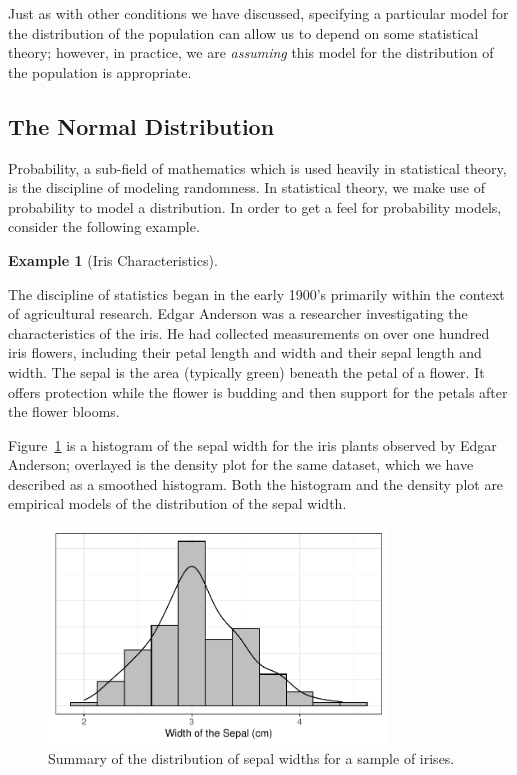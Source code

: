\documentclass[
  letterpaper,
  DIV=11,
  numbers=noendperiod]{scrreprt}
\theoremstyle{definition}
\theoremstyle{definition}
\newtheorem{example}{Example}[chapter]
\theoremstyle{plain}
\theoremstyle{remark}
\begin{document}
Just as with other conditions we have discussed, specifying a particular
model for the distribution of the population can allow us to depend on
some statistical theory; however, in practice, we are \emph{assuming}
this model for the distribution of the population is appropriate.

\hypertarget{the-normal-distribution}{%
\subsection{The Normal Distribution}\label{the-normal-distribution}}

Probability, a sub-field of mathematics which is used heavily in
statistical theory, is the discipline of modeling randomness. In
statistical theory, we make use of probability to model a distribution.
In order to get a feel for probability models, consider the following
example.

\begin{example}[Iris
Characteristics]\protect\hypertarget{exm-iris}{}\label{exm-iris}

The discipline of statistics began in the early 1900's primarily within
the context of agricultural research. Edgar Anderson was a researcher
investigating the characteristics of the iris. He had collected
measurements on over one hundred iris flowers, including their petal
length and width and their sepal length and width. The sepal is the area
(typically green) beneath the petal of a flower. It offers protection
while the flower is budding and then support for the petals after the
flower blooms.

\end{example}

Figure~\ref{fig-regconditions-iris-histogram} is a histogram of the
sepal width for the iris plants observed by Edgar Anderson; overlayed is
the density plot for the same dataset, which we have described as a
smoothed histogram. Both the histogram and the density plot are
empirical models of the distribution of the sepal width.

\begin{figure}

{\centering \includegraphics[width=0.8\textwidth,height=\textheight]{./images/fig-regconditions-iris-histogram-1.pdf}

}

\caption{\label{fig-regconditions-iris-histogram}Summary of the
distribution of sepal widths for a sample of irises.}

\end{figure}
\end{document}
